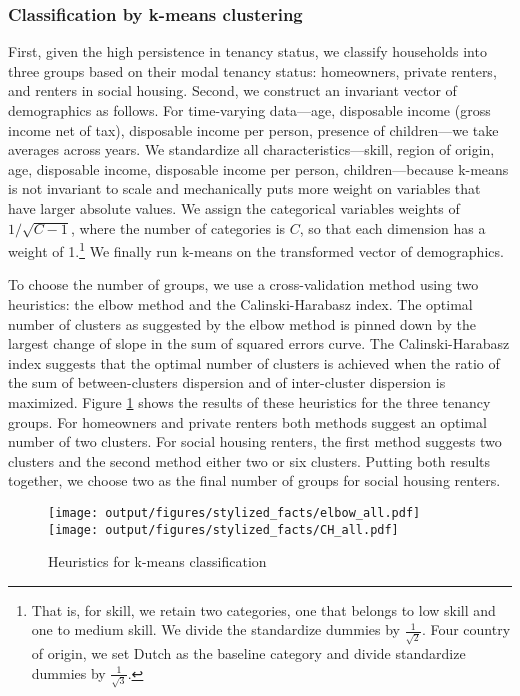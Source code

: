 \documentclass[11pt]{article}
\begin{document}
\subsubsection{Classification by k-means clustering}\label{sec: appendix clustering} 

First, given the high persistence in tenancy status, we classify households into three groups based on their modal tenancy status: homeowners, private renters, and renters in social housing. Second, we construct an invariant vector of demographics as follows.  For time-varying data---age, disposable income (gross income net of tax), disposable income per person, presence of children---we take averages across years. We standardize all characteristics---skill, region of origin, age, disposable income, disposable income per person, children---because k-means is not invariant to scale and mechanically puts more weight on variables that have larger absolute values. We assign the categorical variables weights of $1/\sqrt{C-1}$, where the number of categories is $C$, so that each dimension has a weight of 1.\footnote{That is, for skill, we retain two categories, one that belongs to low skill and one to medium skill. We divide the standardize dummies by $\frac{1}{\sqrt{2}}$. Four country of origin, we set Dutch as the baseline category and divide standardize dummies by $\frac{1}{\sqrt{3}}$.} We finally run k-means on the transformed vector of demographics.

To choose the number of groups, we use a cross-validation method using two heuristics: the elbow method and the Calinski-Harabasz index. The optimal number of clusters as suggested by the elbow method is pinned down by the largest change of slope in the sum of squared errors curve. The Calinski-Harabasz index suggests that the optimal number of clusters is achieved when the ratio of the sum of between-clusters dispersion and of inter-cluster dispersion is maximized. Figure \ref{fig:heuristics} shows the results of these heuristics for the three tenancy groups. For homeowners and private renters both methods suggest an optimal number of two clusters. For social housing renters, the first method suggests two clusters and the second method either two or six clusters. Putting both results together, we choose two as the final number of groups for social housing renters.
\begin{figure}[H]
    \centering
    \caption{Heuristics for k-means classification}\label{fig:heuristics}
    \texttt{[image: output/figures/stylized\_facts/elbow\_all.pdf]}%
    \texttt{[image: output/figures/stylized\_facts/CH\_all.pdf]}
\end{figure}
\end{document}
